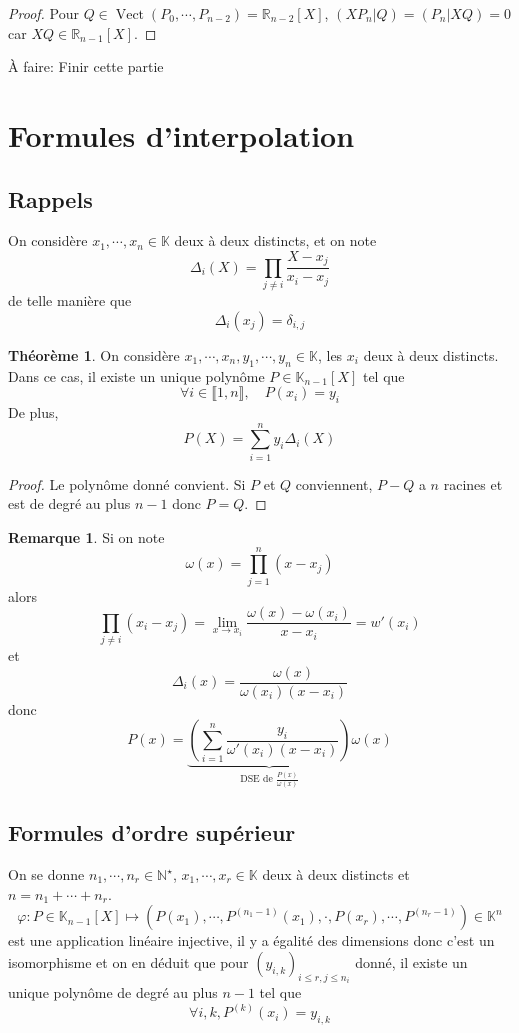 \documentclass{article}
\theoremstyle{definition}
\newtheorem*{thm}{Théorème}
\newtheorem*{rem}{Remarque}
\DeclareMathOperator{\Vect}{Vect}
\newcommand{\todo}[1]{{\color{red}À faire: #1}}
\begin{document}
\begin{proof}
Pour $Q\in\Vect(P_0, \cdots, P_{n-2})=\mathbb R_{n-2}[X]$, $(XP_n|Q)=(P_n|XQ)=0$ car $XQ\in\mathbb R_{n-1}[X]$.
\end{proof}

\todo{Finir cette partie}

\section{Formules d'interpolation}

\subsection{Rappels}

On considère $x_1, \cdots, x_n\in\mathbb K$ deux à deux distincts, et on note \[
    \Delta_i(X)=\prod_{j\neq i}\frac{X-x_j}{x_i-x_j}
\]
de telle manière que \[
    \Delta_i(x_j)=\delta_{i, j}
\]

\begin{thm}
    On considère $x_1, \cdots, x_n, y_1, \cdots, y_n\in\mathbb K$, les $x_i$ deux à deux distincts. Dans ce cas, il existe un unique polynôme $P\in\mathbb K_{n-1}[X]$ tel que \[\forall i\in\llbracket 1, n\rrbracket, \quad P(x_i)=y_i\]
    De plus, \[
        P(X)=\sum_{i=1}^ny_i\Delta_i(X)
    \]
\end{thm}

\begin{proof}
Le polynôme donné convient. Si $P$ et $Q$ conviennent, $P-Q$ a $n$ racines et est de degré au plus $n-1$ donc $P=Q$.
\end{proof}

\begin{rem}
Si on note \[
    \omega (x)=\prod_{j=1}^n(x-x_j)
\]
alors \[
    \prod_{j\neq i}(x_i-x_j)=\lim_{x\to x_i}\frac{\omega(x)-\omega(x_i)}{x-x_i}=w'(x_i)
\]
et \[
    \Delta_i(x)=\frac{\omega (x)}{\omega(x_i)(x-x_i)}
\]
donc \[
    P(x)=\underbrace{\left(\sum_{i=1}^n\frac{y_i}{\omega'(x_i)(x-x_i)}\right)}_{\text{DSE de }\frac{P(x)}{\omega(x)}}\omega(x)
\]
\end{rem}

\subsection{Formules d'ordre supérieur}

On se donne $n_1, \cdots, n_r\in\mathbb N^\star$, $x_1, \cdots, x_r\in\mathbb K$ deux à deux distincts et $n=n_1+\cdots+n_r$. \[
    \varphi: P\in\mathbb K_{n-1}[X]\longmapsto(P(x_1), \cdots, P^{(n_1-1)}(x_1), \cdot, P(x_r), \cdots, P^{(n_r-1)})\in\mathbb K^n
\]
est une application linéaire injective, il y a égalité des dimensions donc c'est un isomorphisme et on en déduit que pour $(y_{i, k})_{i\leq r, j\leq n_i}$ donné, il existe un unique polynôme de degré au plus $n-1$ tel que \[
    \forall i, k, P^{(k)}(x_i)=y_{i, k}
\]
\end{document}
